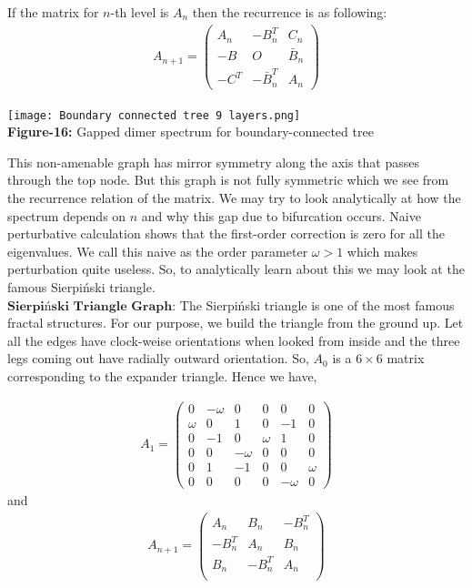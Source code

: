 \documentclass{article}
\begin{document}
	If the matrix for $n$-th level is $A_n$ then the recurrence is as following: \\
	
	\begin{align}
		A_{n+1}=
		\begin{pmatrix}
			A_n & -B_n^T & C_n\\
			-B & O & \bar B_n\\
			-C^T & -\bar B_n^T &A_n
		\end{pmatrix}
	\end{align}
	
	\begin{center}
		\texttt{[image: Boundary connected tree 9 layers.png]}\\
		\textbf{Figure-16:} Gapped dimer spectrum for boundary-connected tree
	\end{center}
	
	This non-amenable graph has mirror symmetry along the axis that passes through the top node. But this graph is not fully symmetric which we see from the recurrence relation of the matrix. We may try to look analytically at how the spectrum depends on $n$ and why this gap due to bifurcation occurs. Naive perturbative calculation shows that the first-order correction is zero for all the eigenvalues. We call this naive as the order parameter $\omega>1$ which makes perturbation quite useless. So, to analytically learn about this we may look at the famous Sierpi\'nski triangle. \\
	
	$\textbf{Sierpi\'nski Triangle Graph:}$ The Sierpi\'nski triangle is one of the most famous fractal structures. For our purpose, we build the triangle from the ground up. Let all the edges have clock-weise orientations when looked from inside and the three legs coming out have radially outward orientation. So, $A_0$ is a $6 \times 6$ matrix corresponding to the expander triangle. Hence we have, 
	
	\begin{align}
		A_1=
		\begin{pmatrix}
			0&-\omega&0&0&0&0\\
			\omega&0&1&0&-1&0\\
			0&-1&0&\omega&1&0\\
			0&0&-\omega&0&0&0\\
			0&1&-1&0&0&\omega\\
			0&0&0&0&-\omega&0
		\end{pmatrix}
	\end{align}
	and 
	\begin{align}
		A_{n+1}=
		\begin{pmatrix}
			A_n&B_n&-B_n^T\\
			-B_n^T& A_n &B_n\\
			B_n & -B_n^T & A_n\\
		\end{pmatrix}
	\end{align}
	
\end{document}
